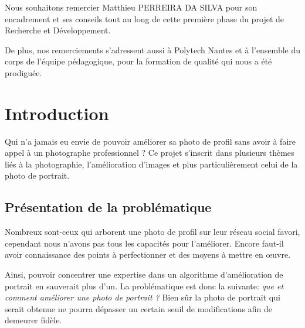 \documentclass[11pt, french,screen]{report-rd-info}
\begin{document}
\begin{classification}
\end{classification}
\maketitle
\begin{acknowledgements}
Nous souhaitons remercier Matthieu PERREIRA DA SILVA pour son encadrement et ses conseils tout au long de cette première phase du projet de Recherche et Développement.

De plus, nos remerciements s'adressent aussi à Polytech Nantes et à l'ensemble du corps de l'équipe pédagogique, pour la formation de qualité qui nous a été prodiguée.
\end{acknowledgements}
\newpage
\tableofcontents
\chapter{Introduction}
Qui n'a jamais eu envie de pouvoir améliorer sa photo de profil sans avoir à faire appel à un photographe professionnel ? Ce projet s'inscrit dans plusieurs thèmes liés à la photographie, l'amélioration d'images et plus particulièrement celui de la photo de portrait.
\section{Présentation de la problématique}
Nombreux sont-ceux qui arborent une photo de profil sur leur réseau social favori, cependant nous n'avons pas tous les capacités pour l'améliorer. Encore faut-il avoir connaissance des points à perfectionner et des moyens à mettre en œuvre.

Ainsi, pouvoir concentrer une expertise dans un algorithme d'amélioration de portrait en sauverait plus d'un. La problématique est donc la suivante: \emph{que et comment améliorer une photo de portrait ?} Bien sûr la photo de portrait qui serait obtenue ne pourra dépasser un certain seuil de modifications afin de demeurer fidèle.
\end{document}

